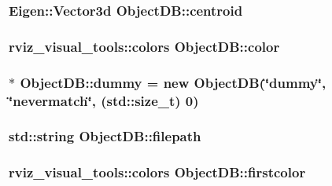 \hypertarget{structObjectDB_a28f2e4ccb5338e593f84d57cf174295a}{
\subsubsection[{centroid}]{\setlength{\rightskip}{0pt plus 5cm}Eigen\-::\-Vector3d Object\-D\-B\-::centroid}}\label{structObjectDB_a28f2e4ccb5338e593f84d57cf174295a}
\hypertarget{structObjectDB_a836db3f6e7558a6d9e634b6ea0f0f587}{
\subsubsection[{color}]{\setlength{\rightskip}{0pt plus 5cm}rviz\-\_\-visual\-\_\-tools\-::colors Object\-D\-B\-::color}}\label{structObjectDB_a836db3f6e7558a6d9e634b6ea0f0f587}
\hypertarget{structObjectDB_a50ed67ad47552cecb2f94837740d70ff}{
\subsubsection[{dummy}]{ $\ast$ Object\-D\-B\-::dummy = new {\bf Object\-D\-B}(\char`\"{}dummy\char`\"{}, \char`\"{}nevermatch\char`\"{}, (std\-::size\-\_\-t) 0)\hspace{0.3cm}{\ttfamily [static]}}}\label{structObjectDB_a50ed67ad47552cecb2f94837740d70ff}
\hypertarget{structObjectDB_a2e171343bb62d57745e9bbb02c8a6bf7}{
\subsubsection[{filepath}]{\setlength{\rightskip}{0pt plus 5cm}std\-::string Object\-D\-B\-::filepath}}\label{structObjectDB_a2e171343bb62d57745e9bbb02c8a6bf7}
\hypertarget{structObjectDB_aae11be013aa483a2b10b6a880d68ee5f}{
\subsubsection[{firstcolor}]{\setlength{\rightskip}{0pt plus 5cm}rviz\-\_\-visual\-\_\-tools\-::colors Object\-D\-B\-::firstcolor}}\label{structObjectDB_aae11be013aa483a2b10b6a880d68ee5f}
